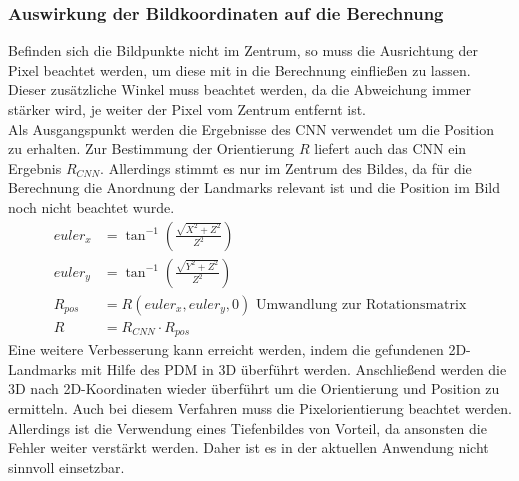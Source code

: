 \subsubsection{Auswirkung der Bildkoordinaten auf die Berechnung}
Befinden sich die Bildpunkte nicht im Zentrum, so muss die Ausrichtung der Pixel beachtet werden, um diese mit in die Berechnung einfließen zu lassen. Dieser zusätzliche Winkel muss beachtet werden, da die Abweichung immer stärker wird, je weiter der Pixel vom Zentrum entfernt ist.\\ 
Als Ausgangspunkt werden die Ergebnisse des CNN verwendet um die Position zu erhalten. Zur Bestimmung der Orientierung $R$ liefert auch das CNN ein Ergebnis $R_{CNN}$. Allerdings stimmt es nur im Zentrum des Bildes, da für die Berechnung die Anordnung der Landmarks relevant ist und die Position im Bild noch nicht beachtet wurde.\\
\begin{align*}
euler_x &= \tan^{-1}(\frac{\sqrt{X^2+Z^2}}{Z^2})\\
euler_y &= \tan^{-1}(\frac{\sqrt{Y^2+Z^2}}{Z^2})\\
R_{pos} &= R(euler_x,euler_y,0)\text{ Umwandlung zur Rotationsmatrix}\\
R &= R_{CNN}\cdot R_{pos}
\end{align*}
Eine weitere Verbesserung kann erreicht werden, indem die gefundenen 2D-Landmarks mit Hilfe des PDM in 3D überführt werden. Anschließend werden die 3D nach 2D-Koordinaten wieder überführt um die Orientierung und Position zu ermitteln. Auch bei diesem Verfahren muss die Pixelorientierung beachtet werden.
\newpage
Allerdings ist die Verwendung eines Tiefenbildes von Vorteil, da ansonsten die Fehler weiter verstärkt werden. Daher ist es in der aktuellen Anwendung nicht sinnvoll einsetzbar.\cite{OpenFace}
